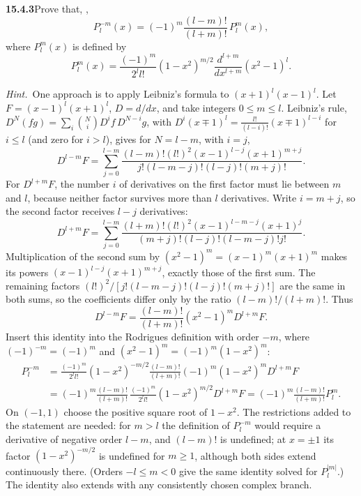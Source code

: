 \par\bigskip
\noindent\textbf{15.4.3}\quad Prove that, ,
\[
P_{l}^{-m}(x)=(-1)^{m}\frac{(l-m)!}{(l+m)!}\,P_{l}^{m}(x),
\]
where $P_{l}^{m}(x)$ is defined by
\[
P_{l}^{m}(x)=\frac{(-1)^{m}}{2^{l}l!}(1-x^{2})^{m/2}
\frac{d^{l+m}}{dx^{l+m}}(x^{2}-1)^{l}.
\]
\par\emph{Hint.}~One approach is to apply Leibniz's formula to
$(x+1)^{l}(x-1)^{l}$.
\solution
Let $F=(x-1)^l(x+1)^l$, $D=d/dx$, and take integers $0\le m\le l$.
Leibniz's rule, $D^N(fg)=\sum_i\binom Ni D^if\,D^{N-i}g$, with
$D^i(x\mp1)^l=\frac{l!}{(l-i)!}(x\mp1)^{l-i}$ for $i\le l$ (and zero for
$i>l$), gives for $N=l-m$, with $i=j$,
\[
D^{l-m}F=\sum_{j=0}^{l-m}
\frac{(l-m)!(l!)^2(x-1)^{l-j}(x+1)^{m+j}}
{j!(l-m-j)!(l-j)!(m+j)!}.
\]
For $D^{l+m}F$, the number $i$ of derivatives on the first factor
must lie between $m$ and $l$, because neither factor survives more than
$l$ derivatives. Write $i=m+j$, so the second factor receives $l-j$
derivatives:
\[
D^{l+m}F=\sum_{j=0}^{l-m}
\frac{(l+m)!(l!)^2(x-1)^{l-m-j}(x+1)^j}
{(m+j)!(l-j)!(l-m-j)!j!}.
\]
Multiplication of the second sum by $(x^2-1)^m=(x-1)^m(x+1)^m$ makes
its powers $(x-1)^{l-j}(x+1)^{m+j}$, exactly those of the first sum.
The remaining factors $(l!)^2/[j!(l-m-j)!(l-j)!(m+j)!]$ are the same in
both sums, so the coefficients differ only by the ratio
$(l-m)!/(l+m)!$. Thus
\[
D^{l-m}F=\frac{(l-m)!}{(l+m)!}(x^2-1)^mD^{l+m}F.
\]
Insert this identity into the Rodrigues definition with order $-m$,
where $(-1)^{-m}=(-1)^m$ and $(x^2-1)^m=(-1)^m(1-x^2)^m$:
\begin{align*}
P_l^{-m}
&=\frac{(-1)^m}{2^ll!}(1-x^2)^{-m/2}
 \frac{(l-m)!}{(l+m)!}(-1)^m(1-x^2)^mD^{l+m}F\\
&=(-1)^m\frac{(l-m)!}{(l+m)!}\,
 \frac{(-1)^m}{2^ll!}(1-x^2)^{m/2}D^{l+m}F
=\boxed{(-1)^m\frac{(l-m)!}{(l+m)!}P_l^m}.
\end{align*}
On $(-1,1)$ choose the positive square root of $1-x^2$.
The restrictions added to the statement are needed: for $m>l$ the
definition of $P_l^{-m}$ would require a derivative of negative order
$l-m$, and $(l-m)!$ is undefined; at $x=\pm1$ its factor
$(1-x^2)^{-m/2}$ is undefined for $m\ge1$, although both sides extend
continuously there. (Orders $-l\le m<0$ give the same identity solved
for $P_l^{|m|}$.)
The identity also extends with any consistently chosen complex branch.

